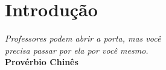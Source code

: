 \chapter{Introdução}\label{cap:cap_01}

\begin{flushright}
	\textit{
		Professores podem abrir a porta, mas você \\ precisa passar por ela por você mesmo. 
	} \\
	
	\textbf{Provérbio Chinês}
\end{flushright}